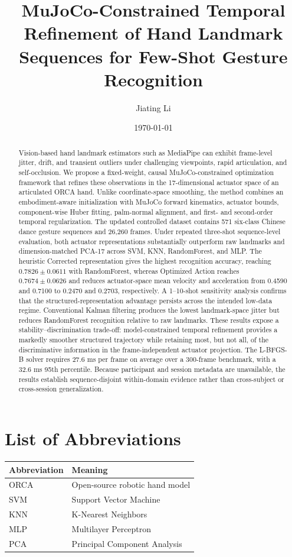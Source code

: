 \documentclass[11pt]{article}
\title{MuJoCo-Constrained Temporal Refinement of Hand Landmark Sequences for Few-Shot Gesture Recognition}
\author{Jiating Li}
\date{\today}
\begin{document}
\maketitle

\begin{abstract}
Vision-based hand landmark estimators such as MediaPipe can exhibit frame-level jitter, drift, and transient outliers under challenging viewpoints, rapid articulation, and self-occlusion. We propose a fixed-weight, causal MuJoCo-constrained optimization framework that refines these observations in the 17-dimensional actuator space of an articulated ORCA hand. Unlike coordinate-space smoothing, the method combines an embodiment-aware initialization with MuJoCo forward kinematics, actuator bounds, component-wise Huber fitting, palm-normal alignment, and first- and second-order temporal regularization. The updated controlled dataset contains 571 six-class Chinese dance gesture sequences and 26,260 frames. Under repeated three-shot sequence-level evaluation, both actuator representations substantially outperform raw landmarks and dimension-matched PCA-17 across SVM, KNN, RandomForest, and MLP. The heuristic Corrected representation gives the highest recognition accuracy, reaching $0.7826\pm0.0611$ with RandomForest, whereas Optimized Action reaches $0.7674\pm0.0626$ and reduces actuator-space mean velocity and acceleration from 0.4590 and 0.7100 to 0.2470 and 0.2703, respectively. A 1--10-shot sensitivity analysis confirms that the structured-representation advantage persists across the intended low-data regime. Conventional Kalman filtering produces the lowest landmark-space jitter but reduces RandomForest recognition relative to raw landmarks. These results expose a stability--discrimination trade-off: model-constrained temporal refinement provides a markedly smoother structured trajectory while retaining most, but not all, of the discriminative information in the frame-independent actuator projection. The L-BFGS-B solver requires 27.6 ms per frame on average over a 300-frame benchmark, with a 32.6 ms 95th percentile. Because participant and session metadata are unavailable, the results establish sequence-disjoint within-domain evidence rather than cross-subject or cross-session generalization.
\end{abstract}


\section*{List of Abbreviations}
\begin{center}
\begin{tabular}{@{}ll@{}}
\toprule
Abbreviation & Meaning \\
\midrule
ORCA & Open-source robotic hand model \\
SVM & Support Vector Machine \\
KNN & K-Nearest Neighbors \\
MLP & Multilayer Perceptron \\
PCA & Principal Component Analysis \\
\bottomrule
\end{tabular}
\end{center}
\end{document}

